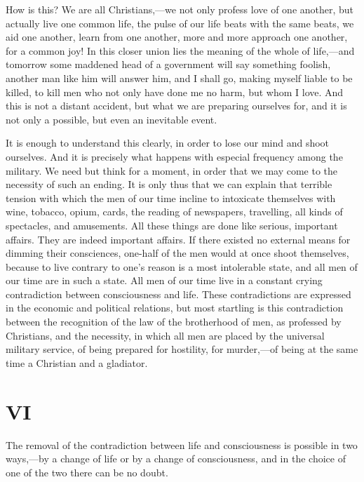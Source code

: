 \documentclass{book}
\begin{document}
How is this? We are all Christians,—we not only profess love of one another, but actually live one common life, the pulse of our life beats with the same beats, we aid one another, learn from one another, more and more approach one another, for a common joy! In this closer union lies the meaning of the whole of life,—and tomorrow some maddened head of a government will say something foolish, another man like him will answer him, and I shall go, making myself liable to be killed, to kill men who not only have done me no harm, but whom I love. And this is not a distant accident, but what we are preparing ourselves for, and it is not only a possible, but even an inevitable event.

It is enough to understand this clearly, in order to lose our mind and shoot ourselves. And it is precisely what happens with especial frequency among the military. We need but think for a moment, in order that we may come to the necessity of such an ending. It is only thus that we can explain that terrible tension with which the men of our time incline to intoxicate themselves with wine, tobacco, opium, cards, the reading of newspapers, travelling, all kinds of spectacles, and amusements. All these things are done like serious, important affairs. They are indeed important affairs. If there existed no external means for dimming their consciences, one-half of the men would at once shoot themselves, because to live contrary to one’s reason is a most intolerable state, and all men of our time are in such a state. All men of our time live in a constant crying contradiction between consciousness and life. These contradictions are expressed in the economic and political relations, but most startling is this contradiction between the recognition of the law of the brotherhood of men, as professed by Christians, and the necessity, in which all men are placed by the universal military service, of being prepared for hostility, for murder,—of being at the same time a Christian and a gladiator.

\chapter*{VI}
\label{chapter-6}
The removal of the contradiction between life and consciousness is possible in two ways,—by a change of life or by a change of consciousness, and in the choice of one of the two there can be no doubt.
\end{document}
